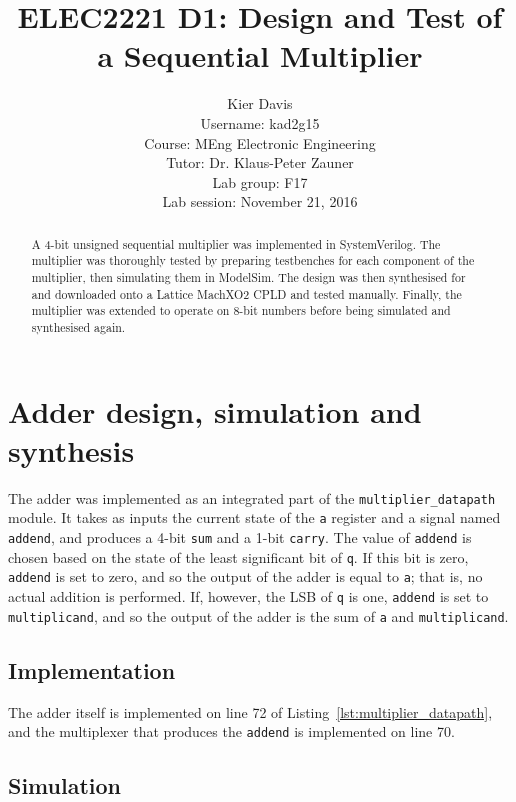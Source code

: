\documentclass[a4paper]{article}
\title{ELEC2221 D1: Design and Test of a Sequential Multiplier}
\author{Kier Davis \\
Username: kad2g15 \\
Course: MEng Electronic Engineering \\
Tutor: Dr. Klaus-Peter Zauner \\
Lab group: F17 \\
Lab session: November 21, 2016}
\begin{document}
\maketitle


\begin{abstract}
  A 4-bit unsigned sequential multiplier was implemented in SystemVerilog. The multiplier was thoroughly tested by preparing testbenches for each component of the multiplier, then simulating them in ModelSim. The design was then synthesised for and downloaded onto a Lattice MachXO2 CPLD and tested manually. Finally, the multiplier was extended to operate on 8-bit numbers before being simulated and synthesised again.
\end{abstract}


\section{Adder design, simulation and synthesis}
\label{sec:adder}

The adder was implemented as an integrated part of the \texttt{multiplier\_datapath} module. It takes as inputs the current state of the \texttt{a} register and a signal named \texttt{addend}, and produces a 4-bit \texttt{sum} and a 1-bit \texttt{carry}. The value of \texttt{addend} is chosen based on the state of the least significant bit of \texttt{q}. If this bit is zero, \texttt{addend} is set to zero, and so the output of the adder is equal to \texttt{a}; that is, no actual addition is performed. If, however, the LSB of \texttt{q} is one, \texttt{addend} is set to \texttt{multiplicand}, and so the output of the adder is the sum of \texttt{a} and \texttt{multiplicand}.

\subsection{Implementation}
\label{sec:adder:impl}

The adder itself is implemented on line 72 of Listing~\ref{lst:multiplier_datapath}, and the multiplexer that produces the \texttt{addend} is implemented on line 70.

\subsection{Simulation}
\label{sec:adder:sim}
\end{document}
